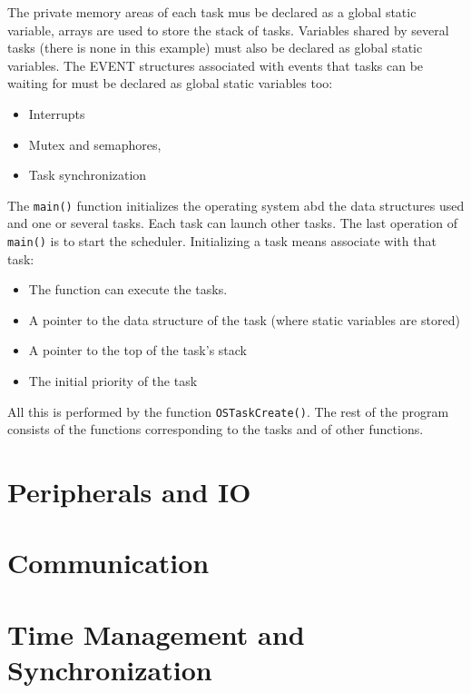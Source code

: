 \documentclass[../main.tex]{subfiles}
\renewcommand{\codeSrc}{../code/}
\begin{document}


The private memory areas of each task mus be declared as a global static variable, arrays are used to store the stack of tasks. Variables shared by several tasks (there is none in this example) must also be declared as global static variables. The EVENT structures associated with events that tasks can be waiting for must be declared as global static variables too:
\begin{itemize}
	\item Interrupts
	\item Mutex and semaphores,
	\item Task synchronization
\end{itemize}
The \texttt{main()} function initializes the operating system abd the data structures used and one or several tasks. Each task can launch other tasks. The last operation of \texttt{main()} is to start the scheduler. Initializing a task means associate with that task:
\begin{itemize}
	\item The function can execute the tasks.
	\item A pointer to the data structure of the task (where static variables are stored)
	\item A pointer to the top of the task's stack
	\item The initial priority of the task
\end{itemize}
All this is performed by the function \texttt{OSTaskCreate()}. The rest of the program consists of the functions corresponding to the tasks and of other functions.




\section{Peripherals and IO}
\section{Communication}
\section{Time Management and Synchronization}
\end{document}
